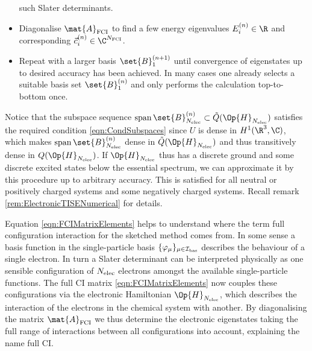 \begin{rem}[Full CI]
\begin{itemize}
		such Slater determinants.
	\item Diagonalise $\mat{A}_\text{FCI}$ to find a few energy eigenvalues
		$E_i^{(n)} \in \R$ and corresponding 
		$\vec{c}^{(n)}_i \in \C^{\Nfci}$.
	\item Repeat with a larger basis $\set{B}_1^{(n+1)}$ until convergence
		of eigenstates up to desired accuracy has been achieved.
		In many cases one already selects a suitable basis set
		$\set{B}_1^{(n)}$ and only performs the calculation top-to-bottom once.
	\end{itemize}
	Notice that the subspace sequence
	$\spacespan \set{B}_{\Nelec}^{(n)} \subset \tilde{Q}(\Op{H}_{\Nelec})$
	satisfies the required condition \eqref{eqn:CondSubspaces}
	since $U$ is dense in $H^1(\R^3, \C)$,
	which makes $\spacespan \set{B}_{\Nelec}^{(n)}$
	dense in $\tilde{Q}(\Op{H}_{\Nelec})$
	and thus transitively dense in $Q(\Op{H}_{\Nelec})$.
	If $\Op{H}_{\Nelec}$ thus has a discrete ground and some discrete
	excited states below the essential spectrum,
	we can approximate it by this procedure up to arbitrary accuracy.
	This is satisfied for all neutral or positively charged systems
	and some negatively charged systems.
	Recall remark \vref{rem:ElectronicTISENumerical} for details.
\end{rem}
Equation \eqref{eqn:FCIMatrixElements} helps to understand
where the term full configuration interaction for the sketched
method comes from.
In some sense a basis function in the single-particle
basis $\{\varphi_\mu\}_{\mu\in\mathcal{I}_\text{bas}}$
describes the behaviour of a single electron.
In turn a Slater determinant can be interpreted physically
as one sensible configuration of $N_\text{elec}$ electrons
amongst the available single-particle functions.
The full CI matrix \eqref{eqn:FCIMatrixElements}
now couples these configurations
via the electronic Hamiltonian $\Op{H}_{\Nelec}$,
which describes the interaction of the electrons in the chemical
system with another.
By diagonalising the matrix $\mat{A}_\text{FCI}$ we thus determine
the electronic eigenstates taking the full range of interactions between
all configurations into account, explaining the name full CI.

